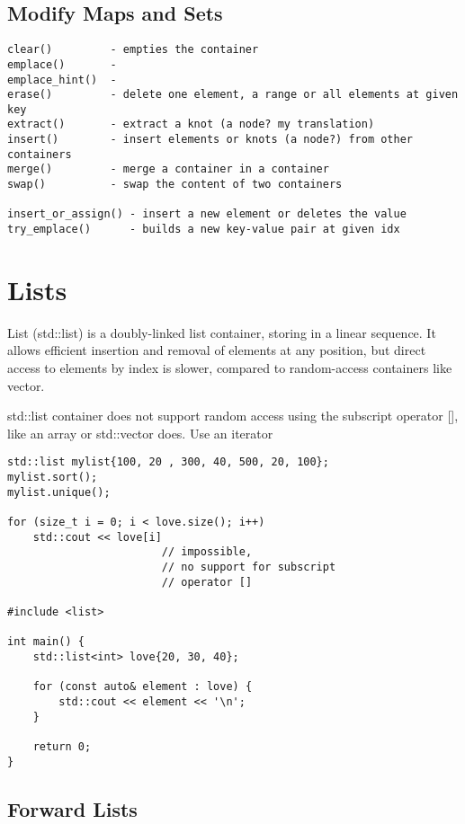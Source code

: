 \documentclass[openany]{report}
\begin{document}
\subsection{Modify Maps and Sets}

\begin{verbatim}
clear()         - empties the container
emplace()       -    
emplace_hint()  -  
erase()         - delete one element, a range or all elements at given key
extract()       - extract a knot (a node? my translation)
insert()        - insert elements or knots (a node?) from other containers
merge()         - merge a container in a container 
swap()          - swap the content of two containers 

insert_or_assign() - insert a new element or deletes the value
try_emplace()      - builds a new key-value pair at given idx
\end{verbatim}

\section{Lists}

List (std::list) is a doubly-linked list container, storing in a linear sequence. 
It allows efficient insertion and removal of elements at any position, 
but direct access to elements by index is slower,
compared to random-access containers like vector.

std::list container does not support random access using the subscript operator [],
like an array or std::vector does. Use an iterator

\begin{verbatim}
std::list mylist{100, 20 , 300, 40, 500, 20, 100};
mylist.sort();
mylist.unique();

for (size_t i = 0; i < love.size(); i++)
    std::cout << love[i] 
                        // impossible, 
                        // no support for subscript
                        // operator []

#include <list>

int main() {
    std::list<int> love{20, 30, 40};

    for (const auto& element : love) {
        std::cout << element << '\n';
    }

    return 0;
}
\end{verbatim}

\subsection{Forward Lists}
\end{document}
